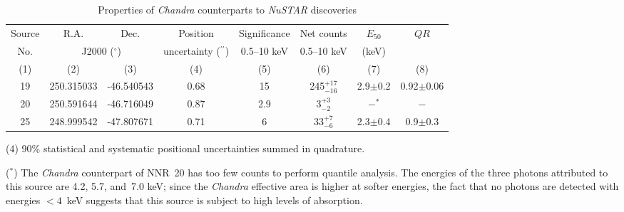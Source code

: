 \documentclass[iop,revtex4]{emulateapj}
\newcommand\T{\rule{0pt}{2.6ex}}       %
\newcommand\B{\rule[-1.2ex]{0pt}{0pt}} %
\newcommand\M{\rule{0pt}{2.3ex}}
\begin{document}
\begin{landscape}
\begin{table}
\begin{minipage}{0.8\linewidth}
\centering
\footnotesize
\begin{threeparttable}
\caption{Properties of \textit{Chandra} counterparts to \textit{NuSTAR} discoveries}
\begin{tabular}{cccccccc} \hline \hline
\T Source & R.A. & Dec. & Position & Significance & Net counts & $E_{50}$ & $QR$ \\
No. & \multicolumn{2}{c}{J2000 ($^{\circ}$)} & uncertainty ($^{\prime\prime}$) & 0.5--10 keV & 0.5--10 keV & (keV) & \\
\B(1) & (2) & (3) & (4) & (5) & (6) & (7) & (8) \\
\hline
\T 19&250.315033&-46.540543&0.68&15&245$^{+17}_{-16}$&2.9$\pm$0.2&0.92$\pm$0.06\\
\M20&250.591644&-46.716049&0.87&2.9&3$^{+3}_{-2}$&$-^*$&$-$\\
\B\M 25&248.999542&-47.807671&0.71&6&33$^{+7}_{-6}$&2.3$\pm$0.4&0.9$\pm$0.3\\
\hline \hline
\end{tabular}
\begin{tablenotes}[flushleft]
\item (4) 90\% statistical and systematic positional uncertainties summed in quadrature.
\item ($^*$) The \textit{Chandra} counterpart of NNR~20 has too few counts to perform quantile analysis.  The energies of the three photons attributed to this source are 4.2, 5.7, and~7.0 keV; since the \textit{Chandra} effective area is higher at softer energies, the fact that no photons are detected with energies $<4$~keV suggests that this source is subject to high levels of absorption.
\end{tablenotes}
\label{tab:chandrasrc}
\end{threeparttable}
\end{minipage}
\end{table}
\end{landscape}
\end{document}
